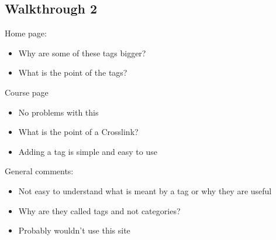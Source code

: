 \documentclass[12pt]{report}
\begin{document}
\subsection{Walkthrough 2}
  Home page:
\begin{itemize}
\item Why are some of these tags bigger?
\item What is the point of the tags?
\end{itemize}
  Course page
\begin{itemize}
\item No problems with this
\item What is the point of a Crosslink?
\item Adding a tag is simple and easy to use
\end{itemize}
General comments:
\begin{itemize}
\item Not easy to understand what is meant by a tag or why they are useful
\item Why are they called tags and not categories?
\item Probably wouldn't use this site
\end{itemize}
\end{document}
